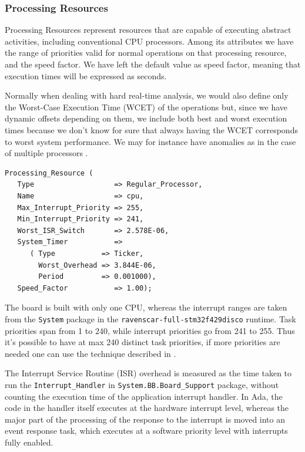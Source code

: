 \documentclass{article}
\begin{document}
\subsubsection{Processing Resources}\label{processing-resources}

Processing Resources represent resources that are capable of executing abstract activities, including conventional CPU processors. Among its attributes we have the range of priorities valid for normal operations on that processing resource, and the speed factor. We have left the default value as speed factor, meaning that execution times will be expressed as seconds.

Normally when dealing with hard real-time analysis, we would also define only the Worst-Case Execution Time (WCET) of the operations but, since we have dynamic offsets depending on them, we include both best and worst execution times because we don't know for sure that always having the WCET corresponds to worst system performance. We may for instance have anomalies as in the case of multiple processors \cite{anomalies-multiprocessor}.

\begin{lstlisting}
Processing_Resource (
   Type                   => Regular_Processor,
   Name                   => cpu,
   Max_Interrupt_Priority => 255,
   Min_Interrupt_Priority => 241,
   Worst_ISR_Switch       => 2.578E-06,
   System_Timer           =>
      ( Type           => Ticker,
        Worst_Overhead => 3.844E-06,
        Period         => 0.001000),
   Speed_Factor           => 1.00);
\end{lstlisting}

The board is built with only one CPU, whereas the interrupt ranges are taken from the \texttt{System} package in the \texttt{ravenscar-full-stm32f429disco} runtime. Task priorities span from 1 to 240, while interrupt priorities go from 241 to 255. Thus it's possible to have at max 240 distinct task priorities, if more priorities are needed one can use the technique described in \cite{limited-priorities}.

The Interrupt Service Routine (ISR) overhead is measured as the time taken to run the \texttt{Interrupt\_Handler} in \texttt{System.BB.Board\_Support} package, without counting the execution time of the application interrupt handler. In Ada, the code in the handler itself executes at the hardware interrupt level, whereas the major part of the processing of the response to the interrupt is moved into an event response task, which executes at a software priority level with interrupts fully enabled.
\end{document}
